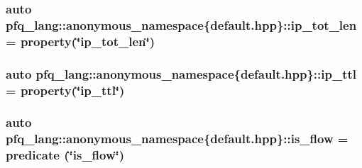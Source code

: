 \hypertarget{namespacepfq__lang_1_1anonymous__namespace_02default_8hpp_03_a172d424ed5943dda09a80d7c63be9490}{
\subsubsection[{ip\+\_\+tot\+\_\+len}]{\setlength{\rightskip}{0pt plus 5cm}auto pfq\+\_\+lang\+::anonymous\+\_\+namespace\{default.\+hpp\}\+::ip\+\_\+tot\+\_\+len = {\bf property}(\char`\"{}ip\+\_\+tot\+\_\+len\char`\"{})}}\label{namespacepfq__lang_1_1anonymous__namespace_02default_8hpp_03_a172d424ed5943dda09a80d7c63be9490}
\hypertarget{namespacepfq__lang_1_1anonymous__namespace_02default_8hpp_03_a3fb042ff6cf76a1f01b4e97e35b30507}{
\subsubsection[{ip\+\_\+ttl}]{\setlength{\rightskip}{0pt plus 5cm}auto pfq\+\_\+lang\+::anonymous\+\_\+namespace\{default.\+hpp\}\+::ip\+\_\+ttl = {\bf property}(\char`\"{}ip\+\_\+ttl\char`\"{})}}\label{namespacepfq__lang_1_1anonymous__namespace_02default_8hpp_03_a3fb042ff6cf76a1f01b4e97e35b30507}
\hypertarget{namespacepfq__lang_1_1anonymous__namespace_02default_8hpp_03_a32aab6804e2daac2458f7c050ed69cf1}{
\subsubsection[{is\+\_\+flow}]{\setlength{\rightskip}{0pt plus 5cm}auto pfq\+\_\+lang\+::anonymous\+\_\+namespace\{default.\+hpp\}\+::is\+\_\+flow = {\bf predicate} (\char`\"{}is\+\_\+flow\char`\"{})}}\label{namespacepfq__lang_1_1anonymous__namespace_02default_8hpp_03_a32aab6804e2daac2458f7c050ed69cf1}
